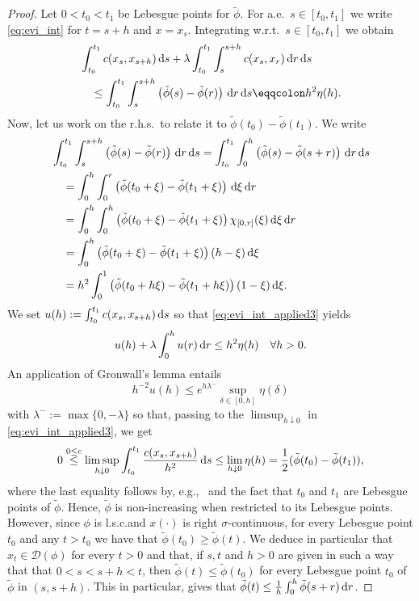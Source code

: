 \documentclass[reqno]{amsart}
\theoremstyle{plain}
\theoremstyle{remark}
\theoremstyle{plain}
\numberwithin{equation}{section}
\theoremstyle{remark}
\newcommand{\de}{{\,\rm d}}
\begin{document}
\begin{proof}
 Let $0<t_0<t_1$ be Lebesgue points for $\tilde \phi$.  For  a.e.~$s \in [t_0,t_1]$ we  write  \eqref{eq:evi_int} for $t=s+h$ and $x=x_s$. Integrating w.r.t.~$s\in [t_0,t_1]$ we obtain 
\begin{align}
    &\int_{t_0}^{t_1} c(x_s,x_{s+h})\de s+\lambda\int_{t_0}^{t_1}\int_{s}^{s+h} c(x_s,x_{ r }) \de r \de s \nonumber\\
    &\quad \le \int_{t_0}^{t_1}\int_{s}^{s+h}\left(\tilde \phi(s)- \tilde \phi(r)\right) \de r \de s \eqqcolon h^2\eta(h).    \label{eq:evi_int_applied3}
\end{align}
Now, let us work on the r.h.s.\ to relate it to $\tilde \phi(t_0)-\tilde \phi(t_1)$.  We write 
\begin{align}
    & \int_{t_0}^{t_1}\int_{s}^{s+h}\left(\tilde \phi(s)- \tilde \phi(r)\right) \de r \de s = \int_{t_0}^{t_1}\int_{0}^{h}\left(\tilde \phi(s)- \tilde \phi(s+r)\right) \de r \de s \nonumber \\
    &\quad = \int_{0}^{h} \int_{0}^{r}\left(\tilde \phi(t_0+\xi)- \tilde \phi(t_1+\xi)\right) \de \xi \de r \nonumber\\
    &\quad= \int_{0}^{h} \int_{0}^{h}\left(\tilde \phi(t_0+\xi)- \tilde \phi(t_1+\xi)\right)\chi_{[0,r]}(\xi) \de \xi \de r \nonumber \\
    &\quad= \int_{0}^{h}\left(\tilde \phi(t_0+\xi)- \tilde \phi(t_1+\xi)\right)(h-\xi)\de \xi\nonumber\\
    &\quad= h^2\int_{0}^{1}\left(\tilde \phi(t_0+h\xi)- \tilde \phi(t_1+h\xi)\right)(1-\xi)\de \xi. \label{eq:bound_eta}
\end{align}
 We set $u(h):= \int_{t_0}^{t_1} c(x_s, x_{s+h})\de s$ so that \eqref{eq:evi_int_applied3} yields
\[ u(h)+ \lambda \int_0^h u(r) \de r \le h^2 \eta(h) \quad  \forall  h>0.\]
An application of Gronwall's lemma entails
\begin{equation}\label{eq:afterg}
h^{-2}u(h) \le e^{h  \lambda^-}\sup_{ \delta \in [0,h]} \eta(\delta)    
\end{equation}
 with $ \lambda^-:=\max\{0,-\lambda\}$  
so that, passing to the $\limsup_{h \downarrow 0}$  in \eqref{eq:evi_int_applied3},  we get 
\begin{equation}\label{eq:limsup_bound}
    0 \stackrel{0\le c}{\le }  \limsup_{h\downarrow 0}\int_{t_0}^{t_1} \frac{c(x_s,x_{s+h})}{h^2}\de s \le \lim_{h \downarrow 0} \eta(h) = \frac{1}{2}(\tilde \phi(t_0)-\tilde \phi(t_1)),
\end{equation}
where the last equality follows by, e.g.,~\cite[Theorem 2.1]{realan} and the fact that $t_0$ and $t_1$ are Lebesgue points of $\tilde{\phi}$. 
Hence, $\tilde \phi$ is non-increasing when restricted  to its Lebesgue points.  However, since $\phi$ is l.s.c.and $x(\cdot)$ is right $\sigma$-continuous, for every Lebesgue point $t_0$ and any $t>t_0$  we have  that $\tilde \phi(t_0) \ge \tilde \phi(t)$.  We deduce in particular that $x_t \in \mathscr{D}(\phi)$ for every $t>0$ and that, if $s,t$ and $h>0$ are given  in such a way that   that $0<s<s+h<t$, then $\tilde \phi (t) \le \tilde \phi (t_0)$ for every Lebesgue point $t_0$ of $\tilde \phi$ in $(s,s+h)$.  This in particular, gives that   $\tilde \phi(t) \le \frac{1}{h} \int_0^h \tilde \phi(s+r) \de r$. 


\end{proof}
\end{document}

